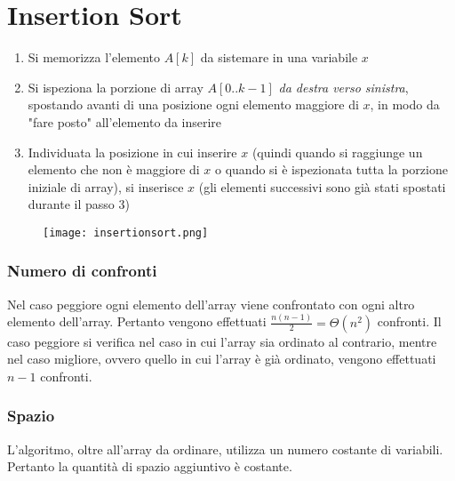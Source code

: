 \section{Insertion Sort}
\begin{enumerate}
    \item Si memorizza l'elemento $A[k]$ da sistemare in una variabile $x$
    \item Si ispeziona la porzione di array $A[0..k-1]$ {\emph{da destra verso sinistra}},
    spostando avanti di una posizione ogni elemento maggiore di $x$, in modo da "fare posto"
    all'elemento da inserire
    \item Individuata la posizione in cui inserire $x$ (quindi quando si 
    raggiunge un elemento che non è maggiore di $x$ o quando si è ispezionata
    tutta la porzione iniziale di array), si inserisce $x$ (gli elementi successivi sono già stati 
    spostati durante il passo 3)
\end{enumerate}

\begin{figure}[h]
    \texttt{[image: insertionsort.png]}
\end{figure}

\subsubsection*{Numero di confronti}
Nel caso peggiore ogni elemento dell'array viene confrontato con ogni altro
elemento dell'array. Pertanto vengono effettuati $\frac{n(n-1)}{2} = \Theta(n^2)$
confronti. Il caso peggiore si verifica nel caso in cui l'array sia ordinato al 
contrario, mentre nel caso migliore, ovvero quello in cui l'array è già ordinato,
vengono effettuati $n - 1$ confronti.

\subsubsection*{Spazio}
L'algoritmo, oltre all'array da ordinare, utilizza un numero costante di variabili.
Pertanto la quantità di spazio aggiuntivo è costante.
\clearpage